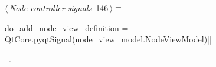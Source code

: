 \documentclass[%
    a4paper,    %
    justified,  %
    nobib,      %
    openany     %
]{tufte-book}
\begin{document}
% 
% 
% 
\begin{flushleft} \small
\begin{minipage}{\linewidth}\label{scrap152}\raggedright\small
{} $\langle\,${\itshape Node controller signals}\nobreak\ {\footnotesize {146}}$\,\rangle\equiv$
\vspace{-1ex}
\begin{pythoncode}
do_add_node_view_definition = QtCore.pyqtSignal(node_view_model.NodeViewModel)|\NWsep|
\end{pythoncode}
\vspace{1.5ex}
\footnotesize
\begin{list}{}{\setlength{\itemsep}{-\parsep}\setlength{\itemindent}{-\leftmargin}}
\item \NWtxtMacroRefIn\ .

\item{}
\end{list}
\end{minipage}\vspace{4ex}
\end{flushleft}
\end{document}
